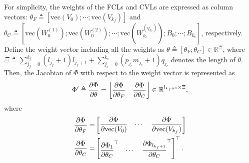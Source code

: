 \documentclass[letterpaper, 10 pt, conference]{ieeeconf}  %
\begin{document}
For simplicity, the weights of the FCLs and CVLs are expressed as column vectors:
$\theta_F \triangleq [\text{vec}( V_{0});\cdots;\text{vec}( V_{k_f})]$ and $\theta_C \triangleq [\text{vec}(W^{(1)}_0);\text{vec}(W^{(2)}_0);\cdots;\text{vec}(W^{(q_{k_c})}_{k_c});B_0;\cdots;B_{k_c}]$, respectively. Define the weight vector including all the weights as $\theta\triangleq [\theta_F;\theta_C]\in\mathbb{R}^\Xi$, where $\Xi\triangleq\sum_{j_f=0}^{k_f} (l_{j_f}+1) l_{j_f+1} + {\sum_{j_c=0}^{k_c} (p_{j_c}m_{j_c}+1)q_{j_c}}$ denotes the length of $\theta$. 
Then, the Jacobian of $\Phi$ with respect to the weight vector is represented as
\begin{equation}
    \Phi'\triangleq 
    {\partial \Phi\over\partial \theta} = 
    \begin{bmatrix}
        \dfrac{\partial \Phi}{\partial \theta_F} & \dfrac{\partial \Phi}{\partial \theta_C}
    \end{bmatrix}
    \in\mathbb{R}^{l_{k_f+1}\times \Xi},
\end{equation}  
where
\begin{equation}
    \begin{aligned}
        {\partial \Phi\over\partial  \theta_F} = &
        \begin{bmatrix}
        \dfrac{\partial \Phi}{\partial \text{vec}( V_0)}
        & \cdots &
        \dfrac{\partial \Phi}{\partial \text{vec}( V_{k_f})}    
        \end{bmatrix}
        \\
        {\partial \Phi\over\partial \theta_C} = &
        \begin{bmatrix}
        \dfrac{\partial \Phi_1}{\partial  \theta_C}^\top  
        & \cdots &
        \dfrac{\partial \Phi_{l_{k_f+1}}}{\partial  \theta_C}^\top      
        \end{bmatrix}^\top.
    \end{aligned}
\end{equation}
\end{document}
